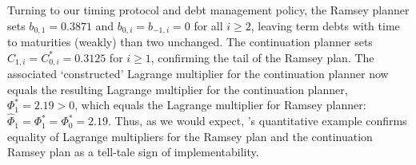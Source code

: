 \documentclass[12pt]{article}
\begin{document}

Turning to our timing protocol and debt management policy, the Ramsey planner sets   $b_{0, 1}= 0.3871$ and  $b_{0, i}=b_{-1, i}=0$  for all $i\geq 2$, leaving term debts with time to maturities (weakly) than two unchanged. The continuation planner sets $C_{1, i}=C_{0, i}^*=0.3125$ for $i\geq 1$, confirming the tail of the Ramsey plan. 
{The associated `constructed' Lagrange multiplier for the continuation planner now equals the resulting Lagrange multiplier for   the continuation planner, ${\Phi}_1^\ast=2.19>0$, which equals  the Lagrange multiplier for Ramsey planner: $\widehat{\Phi}_1=\Phi_1^*=\Phi_0^*=2.19$.}  %
%	
Thus, as we would expect, \citeauthor{debortoli2021optimal}'s quantitative example confirms  equality of    Lagrange multipliers for the Ramsey plan and the continuation Ramsey plan
as a tell-tale sign of implementability. %


%
\end{document}
